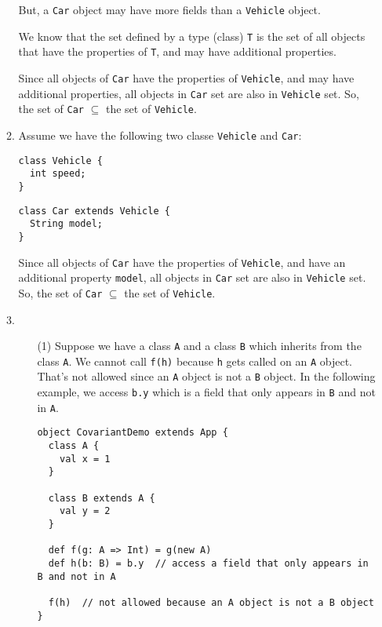 \documentclass[a4paper,11pt]{article} %
\newcommand{\code}[1]{\texttt{#1}}
\begin{document}
\begin{enumerate}
\begin{enumerate}
    But, a \code{Car} object may have more fields than a \code{Vehicle} object.

    We know that the set defined by a type (class) \code{T} is the set of all
    objects that have the properties of \code{T}, and may have additional properties.

    Since all objects of \code{Car} have the properties of \code{Vehicle}, and
    may have additional properties, all objects in \code{Car} set are also in
    \code{Vehicle} set. So, the set of \code{Car} $\subseteq$ the set
    of \code{Vehicle}.

    \item %
    Assume we have the following two classe \code{Vehicle} and \code{Car}:

\begin{lstlisting}
class Vehicle {
  int speed;
}
\end{lstlisting}

\begin{lstlisting}
class Car extends Vehicle {
  String model;
}
\end{lstlisting}

    Since all objects of \code{Car} have the properties of \code{Vehicle}, and
    have an additional property \code{model}, all objects in \code{Car} set are
    also in \code{Vehicle} set. So, the set of \code{Car} $\subseteq$ the set of
    \code{Vehicle}.

    \item %
    \begin{enumerate}
      \item [(1)] Suppose we have a class \code{A} and a class \code{B} which
      inherits from the class \code{A}. We cannot call \code{f(h)} because
      \code{h} gets called on an \code{A} object. That's not allowed since an
      \code{A} object is not a \code{B} object. In the following example, we
      access \code{b.y} which is a field that only appears in \code{B} and not in
      \code{A}.

\begin{lstlisting}
object CovariantDemo extends App {
  class A {
    val x = 1
  }

  class B extends A {
    val y = 2
  }

  def f(g: A => Int) = g(new A)
  def h(b: B) = b.y  // access a field that only appears in B and not in A

  f(h)  // not allowed because an A object is not a B object
}
\end{lstlisting}


\end{enumerate}
\end{enumerate}
\end{enumerate}
\end{document}
